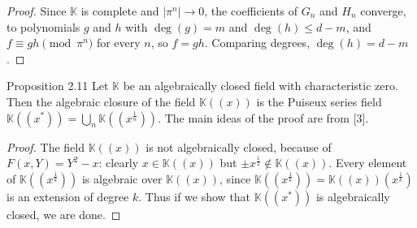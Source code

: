 \documentclass[11pt]{article}
\begin{document}
\begin{proof}
Since $\mathbb{K}$ is complete and $|\pi^n| \rightarrow 0$, the coefficients of $G_n$ and $H_n$ converge, to polynomials $g$ and $h$ with $\deg(g) = m$ and $\deg(h) \leq d - m$, and $f \equiv gh \pmod{\pi^n}$ for every $n$, so $f = gh$. Comparing degrees, $\deg(h) = d - m$.
\end{proof}

\begin{thmbox}{Proposition 2.11}
Let $\mathbb{K}$ be an algebraically closed field with characteristic zero. Then the algebraic closure of the field $\mathbb{K}((x))$ is the Puiseux series field $\mathbb{K}((x^*)) = \bigcup_n \mathbb{K}((x^{\frac1n}))$. The main ideas of the proof are from [3].
\end{thmbox}

\begin{proof}
The field $\mathbb{K}((x))$ is not algebraically closed, because of $F(x, Y) = Y^2 - x$: clearly $x \in \mathbb{K}((x))$ but $\pm x^{\frac12} \notin \mathbb{K}((x))$. Every element of $\mathbb{K}((x^{\frac1k}))$ is algebraic over $\mathbb{K}((x))$, since $\mathbb{K}((x^{\frac1k})) = \mathbb{K}((x))(x^{\frac1k})$ is an extension of degree $k$. Thus if we show that $\mathbb{K}((x^*))$ is algebraically closed, we are done.


\end{proof}
\end{document}
